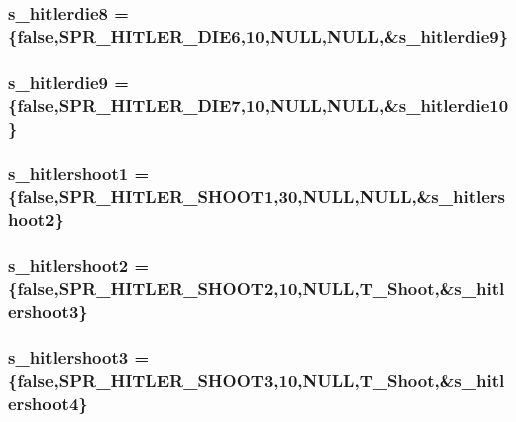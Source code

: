 \label{WL__ACT2_8C_ae016f49d180a3ef7c99c14fbfa4b1fc2}
\hypertarget{WL__ACT2_8C_a8ce15e6926d801bf196772f292046b0f}{
\subsubsection[{s\_\-hitlerdie8}]{ {\bf s\_\-hitlerdie8} = \{false,SPR\_\-HITLER\_\-DIE6,10,NULL,NULL,\&{\bf s\_\-hitlerdie9}\}}}
\label{WL__ACT2_8C_a8ce15e6926d801bf196772f292046b0f}
\hypertarget{WL__ACT2_8C_a91aed7b902a5a6034d1189f16f5e513d}{
\subsubsection[{s\_\-hitlerdie9}]{ {\bf s\_\-hitlerdie9} = \{false,SPR\_\-HITLER\_\-DIE7,10,NULL,NULL,\&{\bf s\_\-hitlerdie10}\}}}
\label{WL__ACT2_8C_a91aed7b902a5a6034d1189f16f5e513d}
\hypertarget{WL__ACT2_8C_ab7f0053924ecd19131ed2db2bc175ebe}{
\subsubsection[{s\_\-hitlershoot1}]{ {\bf s\_\-hitlershoot1} = \{false,SPR\_\-HITLER\_\-SHOOT1,30,NULL,NULL,\&{\bf s\_\-hitlershoot2}\}}}
\label{WL__ACT2_8C_ab7f0053924ecd19131ed2db2bc175ebe}
\hypertarget{WL__ACT2_8C_ab868cc7665bad7da9e30d7e2438128cd}{
\subsubsection[{s\_\-hitlershoot2}]{ {\bf s\_\-hitlershoot2} = \{false,SPR\_\-HITLER\_\-SHOOT2,10,NULL,T\_\-Shoot,\&{\bf s\_\-hitlershoot3}\}}}
\label{WL__ACT2_8C_ab868cc7665bad7da9e30d7e2438128cd}
\hypertarget{WL__ACT2_8C_aa7eb2f5b42eac804651a502215491e57}{
\subsubsection[{s\_\-hitlershoot3}]{ {\bf s\_\-hitlershoot3} = \{false,SPR\_\-HITLER\_\-SHOOT3,10,NULL,T\_\-Shoot,\&{\bf s\_\-hitlershoot4}\}}}
